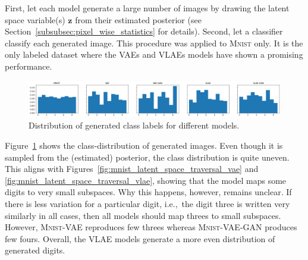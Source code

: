 First, let each model generate a large number of images by drawing the latent space variable(s) $\bm{z}$ from their estimated posterior (see Section~\ref{subsubsec:pixel_wise_statistics} for details).
Second, let a classifier classify each generated image.
This procedure was applied to \textsc{Mnist} only.
It is the only labeled dataset where the \acp{VAE} and \acp{VLAE} models have shown a promising performance.

\begin{figure}
    \centering
    \includegraphics[width=\textwidth]{images/generated_vs_true/mnist/class_distr.png}
    \caption{Distribution of generated class labels for different models.}
    \label{fig:generated_class_distribution}
\end{figure}

Figure~\ref{fig:generated_class_distribution} shows the class-distribution of generated images.
Even though it is sampled from the (estimated) posterior, the class distribution is quite uneven.
This aligns with Figures~\ref{fig:mnist_latent_space_traversal_vae} and \ref{fig:mnist_latent_space_traversal_vlae}, showing that the model maps some digits to very small subspaces.
Why this happens, however, remains unclear.
If there is less variation for a particular digit, i.e.,~the digit three is written very similarly in all cases, then all models should map threes to small subspaces.
However, \textsc{Mnist}-\ac{VAE} reproduces few threes whereas \textsc{Mnist}-\ac{VAE}-\ac{GAN} produces few fours.
Overall, the \ac{VLAE} models generate a more even distribution of generated digits.

